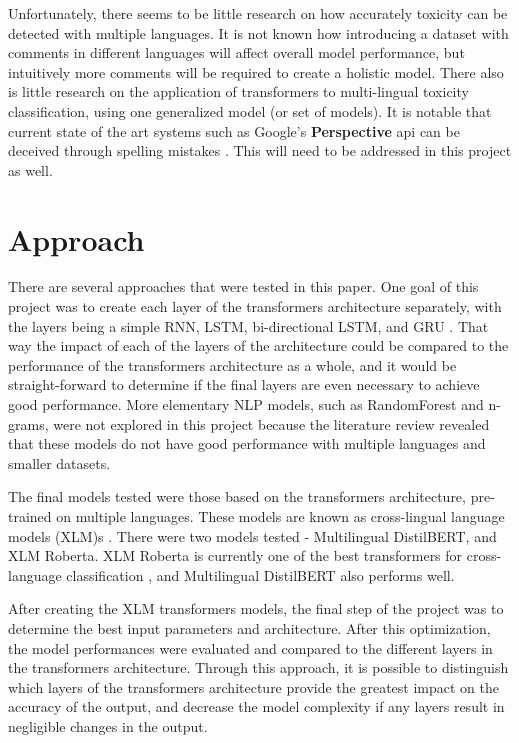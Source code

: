 \documentclass{article}
\begin{document}
Unfortunately, there seems to be little research on how accurately toxicity can be detected with multiple languages. It is not known how introducing a dataset with comments in different languages will affect overall model performance, but intuitively more comments will be required to create a holistic model. There also is little research on the application of transformers to multi-lingual toxicity classification, using one generalized model (or set of models). It is notable that current state of the art systems such as Google's \textbf{Perspective} api can be deceived through spelling mistakes \cite{hosseini2017deceiving}. This will need to be addressed in this project as well.

\section{Approach}

There are several approaches that were tested in this paper. One goal of this project was to create each layer of the transformers architecture separately, with the layers being a simple RNN, LSTM, bi-directional LSTM, and GRU \cite{lample2019crosslingual}. That way the impact of each of the layers of the architecture could be compared to the performance of the transformers architecture as a whole, and it would be straight-forward to determine if the final layers are even necessary to achieve good performance. More elementary NLP models, such as RandomForest and n-grams, were not explored in this project because the literature review revealed that these models do not have good performance with multiple languages and smaller datasets.

The final models tested were those based on the transformers architecture, pre-trained on multiple languages. These models are known as cross-lingual language models (XLM)s \cite{lample2019crosslingual}. There were two models tested - Multilingual DistilBERT, and XLM Roberta. XLM Roberta is currently one of the best transformers for cross-language classification \cite{deep_learning_approaches}, and Multilingual DistilBERT also performs well.

After creating the XLM transformers models, the final step of the project was to determine the best input parameters and architecture. After this optimization, the model performances were evaluated and compared to the different layers in the transformers architecture. Through this approach, it is possible to distinguish which layers of the transformers architecture provide the greatest impact on the accuracy of the output, and decrease the model complexity if any layers result in negligible changes in the output.
\end{document}
